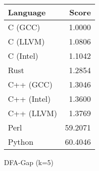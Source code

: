 \begin{subtable}{0.33\textwidth}
    \centering
    \begin{tabular}{|l|r|}
        \hline
        Language & Score \\
        \hline
        C (GCC) & 1.0000 \\
        C (LLVM) & 1.0806 \\
        C (Intel) & 1.1042 \\
        Rust & 1.2854 \\
        C++ (GCC) & 1.3046 \\
        C++ (Intel) & 1.3600 \\
        C++ (LLVM) & 1.3769 \\
        Perl & 59.2071 \\
        Python & 60.4046 \\
        \hline
    \end{tabular}
    \caption{DFA-Gap (k=5)}
    \label{table:runtime:dfa_gap(5)}
\end{subtable}
